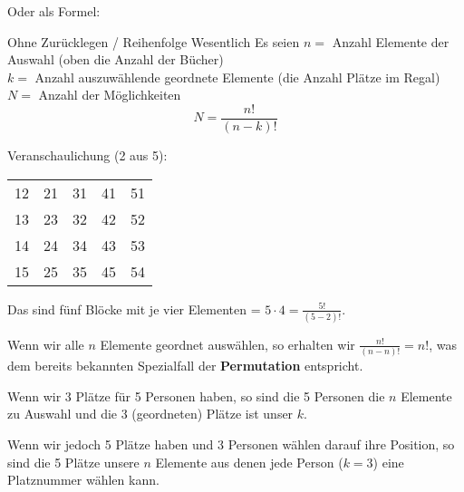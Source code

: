 
Oder als Formel:
\begin{gesetz}{Ohne Zurücklegen / Reihenfolge Wesentlich}{}
Es seien
$n = $ Anzahl Elemente der Auswahl (oben die Anzahl der Bücher)\\
$k = $ Anzahl auszuwählende geordnete Elemente (die Anzahl Plätze im Regal)\\
$N = $ Anzahl der Möglichkeiten\\

$$N =\frac{n!}{(n-k)!}$$
\end{gesetz}

Veranschaulichung (2 aus 5):

\begin{tabular}{c|c|c|c|c}
12 & 21 & 31 & 41 & 51\\
13 & 23 & 32 & 42 & 52\\
14 & 24 & 34 & 43 & 53\\
15 & 25 & 35 & 45 & 54\\
\end{tabular}

Das sind fünf Blöcke mit je vier Elementen = $5\cdot{}4 = \frac{5!}{(5-2)!}$.
\newpage

\begin{bemerkung}{}{}
Wenn wir alle $n$ Elemente geordnet auswählen, so erhalten wir
$\frac{n!}{(n-n)!} = n!$, was dem bereits bekannten Spezialfall der \textbf{Permutation}
entspricht.
\end{bemerkung}

\begin{bemerkung}{}{}
Wenn wir 3 Plätze für 5 Personen haben, so sind die 5 Personen die $n$
Elemente zu Auswahl und die 3 (geordneten) Plätze ist unser $k$.

Wenn wir jedoch 5 Plätze haben und 3 Personen wählen darauf ihre
Position, so sind die 5 Plätze unsere $n$ Elemente aus denen jede
Person ($k=3$) eine Platznummer wählen kann.
\end{bemerkung}

\newpage

